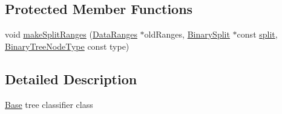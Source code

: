 \subsection*{Protected Member Functions}
\begin{DoxyCompactItemize}
\item 
void \hyperlink{classffactory_1_1_base_tree_classifier_afa7b131c6d2d3f27b9b79c32f8f9d81e}{make\-Split\-Ranges} (\hyperlink{classffactory_1_1_data_ranges}{Data\-Ranges} $\ast$old\-Ranges, \hyperlink{classffactory_1_1_binary_split}{Binary\-Split} $\ast$const \hyperlink{namespaceffactory_a1fec00d28dbea621e480fd9f221d972e}{split}, \hyperlink{namespaceffactory_a405b9095f0a093ae4770f7638f0eb730}{Binary\-Tree\-Node\-Type} const type)
\end{DoxyCompactItemize}


\subsection{Detailed Description}
\hyperlink{classffactory_1_1_base}{Base} tree classifier class 

